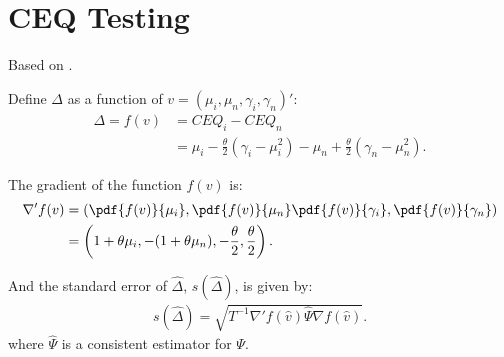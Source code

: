 \documentclass[12pt,oneside,a4paper]{article}
\begin{document}
\clearpage
\section{CEQ Testing}

Based on \cite{lw2008, lw2011}.

Define $\Delta$ as a function of $v = (\mu_{i}, \mu_{n}, \gamma_{i}, \gamma_{n})'$:
\begin{align*}
\Delta = f(v) &= CEQ_{i} - CEQ_{n} 
\\ &= \mu_{i} - \frac{\theta}{2}(\gamma_{i} - \mu^2_{i}) -
\mu_{n} + \frac{\theta}{2}(\gamma_{n} - \mu^2_{n}).
\end{align*}

The gradient of the function $f(v)$ is:
\begin{align*}
\nabla' f(v) &=
\left( 
\pdf{f(v)}{\mu_{i}},
\pdf{f(v)}{\mu_{n}}
\pdf{f(v)}{\gamma_{i}},
\pdf{f(v)}{\gamma_{n}}
\right) \\
&= \left( 1 + \theta \mu_{i}, -(1 + \theta \mu_{n}), -\frac{\theta}{2}, \frac{\theta}{2}  \right).
\end{align*}

And the standard error of $\hat{\Delta}$, $s(\hat{\Delta})$, is given by:
\begin{align*}
	s(\hat{\Delta}) = \sqrt{T^{-1} \nabla'f(\hat{v}) \hat{\Psi} \nabla f(\hat{v})}.
\end{align*}
where $\hat{\Psi}$ is a consistent estimator for $\Psi$.


\clearpage
\renewcommand\bibname{REFERENCES} 


\end{document}
